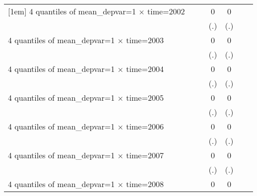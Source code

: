 \begin{table}[htbp]
\begin{tabular}{l*{6}{c}}
[1em]
4 quantiles of mean\_depvar=1 $\times$ time=2002&                     &                     &           0         &           0         &                     &                     \\
                    &                     &                     &         (.)         &         (.)         &                     &                     \\
[1em]
4 quantiles of mean\_depvar=1 $\times$ time=2003&                     &                     &           0         &           0         &                     &                     \\
                    &                     &                     &         (.)         &         (.)         &                     &                     \\
[1em]
4 quantiles of mean\_depvar=1 $\times$ time=2004&                     &                     &           0         &           0         &                     &                     \\
                    &                     &                     &         (.)         &         (.)         &                     &                     \\
[1em]
4 quantiles of mean\_depvar=1 $\times$ time=2005&                     &                     &           0         &           0         &                     &                     \\
                    &                     &                     &         (.)         &         (.)         &                     &                     \\
[1em]
4 quantiles of mean\_depvar=1 $\times$ time=2006&                     &                     &           0         &           0         &                     &                     \\
                    &                     &                     &         (.)         &         (.)         &                     &                     \\
[1em]
4 quantiles of mean\_depvar=1 $\times$ time=2007&                     &                     &           0         &           0         &                     &                     \\
                    &                     &                     &         (.)         &         (.)         &                     &                     \\
[1em]
4 quantiles of mean\_depvar=1 $\times$ time=2008&                     &                     &           0         &           0         &                     &                     \\

\end{tabular}
\end{table}
